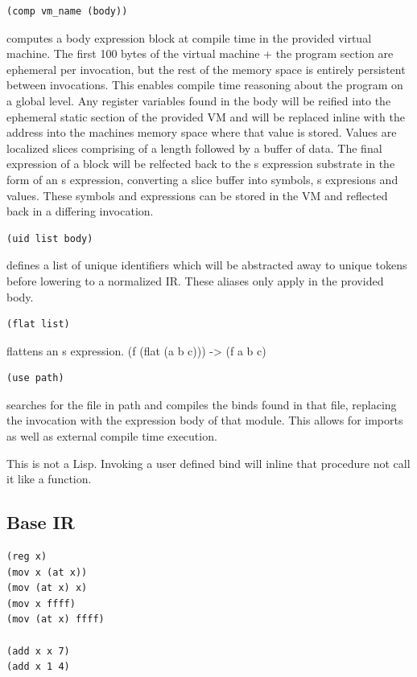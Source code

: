 \documentclass{article}
\begin{document}
	\begin{Verbatim}[tabsize=4]
(comp vm_name (body))
	\end{Verbatim}
	computes a body expression block at compile time in the provided virtual machine. The first 100 bytes of the virtual machine + the program section are ephemeral per invocation, but the rest of the memory space is entirely persistent between invocations. This enables compile time reasoning about the program on a global level. Any register variables found in the body will be reified into the ephemeral static section of the provided VM and will be replaced inline with the address into the machines memory space where that value is stored. Values are localized slices comprising of a length followed by a buffer of data. The final expression of a block will be relfected back to the s expression substrate in the form of an s expression, converting a slice buffer into symbols, s expresions and values. These symbols and expressions can be stored in the VM and reflected back in a differing invocation.

	\begin{Verbatim}[tabsize=4]
(uid list body)
	\end{Verbatim}
	defines a list of unique identifiers which will be abstracted away to unique tokens before lowering to a normalized IR. These aliases only apply in the provided body.

	\begin{Verbatim}[tabsize=4]
(flat list)
	\end{Verbatim}
	flattens an s expression. (f (flat (a b c))) -> (f a b c)

	\begin{Verbatim}[tabsize=4]
(use path)
	\end{Verbatim}

	searches for the file in path and compiles the binds found in that file, replacing the invocation with the expression body of that module. This allows for imports as well as external compile time execution.

	This is not a Lisp. Invoking a user defined bind will inline that procedure not call it like a function.
	\subsection{Base IR}

	\begin{Verbatim}[tabsize=4]
(reg x)
(mov x (at x))
(mov (at x) x)
(mov x ffff)
(mov (at x) ffff)

(add x x 7)
(add x 1 4)
	\end{Verbatim}
\end{document}
